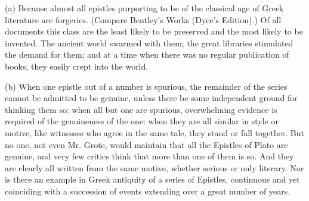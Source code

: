 \documentclass[11pt,letter]{article}
\begin{document}
\par  (a) Because almost all epistles purporting to be of the classical age of Greek literature are forgeries. (Compare Bentley's Works (Dyce's Edition).) Of all documents this class are the least likely to be preserved and the most likely to be invented. The ancient world swarmed with them; the great libraries stimulated the demand for them; and at a time when there was no regular publication of books, they easily crept into the world.

\par  (b) When one epistle out of a number is spurious, the remainder of the series cannot be admitted to be genuine, unless there be some independent ground for thinking them so: when all but one are spurious, overwhelming evidence is required of the genuineness of the one: when they are all similar in style or motive, like witnesses who agree in the same tale, they stand or fall together. But no one, not even Mr. Grote, would maintain that all the Epistles of Plato are genuine, and very few critics think that more than one of them is so. And they are clearly all written from the same motive, whether serious or only literary. Nor is there an example in Greek antiquity of a series of Epistles, continuous and yet coinciding with a succession of events extending over a great number of years.
\end{document}
